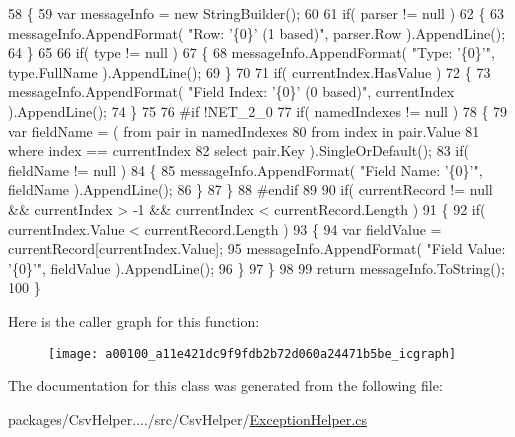 \begin{DoxyCode}
58         \{
59             var messageInfo = \textcolor{keyword}{new} StringBuilder();
60 
61             \textcolor{keywordflow}{if}( parser != null )
62             \{
63                 messageInfo.AppendFormat( \textcolor{stringliteral}{"Row: '\{0\}' (1 based)"}, parser.Row ).AppendLine();
64             \}
65 
66             \textcolor{keywordflow}{if}( type != null )
67             \{
68                 messageInfo.AppendFormat( \textcolor{stringliteral}{"Type: '\{0\}'"}, type.FullName ).AppendLine();
69             \}
70 
71             \textcolor{keywordflow}{if}( currentIndex.HasValue )
72             \{
73                 messageInfo.AppendFormat( \textcolor{stringliteral}{"Field Index: '\{0\}' (0 based)"}, currentIndex ).AppendLine();
74             \}
75 
76 \textcolor{preprocessor}{#if !NET\_2\_0
}
77 \textcolor{preprocessor}{}            \textcolor{keywordflow}{if}( namedIndexes != null )
78             \{
79                 var fieldName = ( from pair in namedIndexes
80                                   from index in pair.Value
81                                   where index == currentIndex
82                                   select pair.Key ).SingleOrDefault();
83                 \textcolor{keywordflow}{if}( fieldName != null )
84                 \{
85                     messageInfo.AppendFormat( \textcolor{stringliteral}{"Field Name: '\{0\}'"}, fieldName ).AppendLine();
86                 \}
87             \}
88 \textcolor{preprocessor}{#endif
}
89 \textcolor{preprocessor}{}
90             \textcolor{keywordflow}{if}( currentRecord != null && currentIndex > -1 && currentIndex < currentRecord.Length )
91             \{
92                 \textcolor{keywordflow}{if}( currentIndex.Value < currentRecord.Length )
93                 \{
94                     var fieldValue = currentRecord[currentIndex.Value];
95                     messageInfo.AppendFormat( \textcolor{stringliteral}{"Field Value: '\{0\}'"}, fieldValue ).AppendLine();
96                 \}
97             \}
98 
99             \textcolor{keywordflow}{return} messageInfo.ToString();
100         \}
\end{DoxyCode}


Here is the caller graph for this function\-:
\nopagebreak
\begin{figure}[H]
\begin{center}
\leavevmode
\texttt{[image: a00100\_a11e421dc9f9fdb2b72d060a24471b5be\_icgraph]}
\end{center}
\end{figure}




The documentation for this class was generated from the following file\-:\begin{DoxyCompactItemize}
\item 
packages/\-Csv\-Helper..../src/\-Csv\-Helper/\hyperlink{a00223}{Exception\-Helper.\-cs}\end{DoxyCompactItemize}
